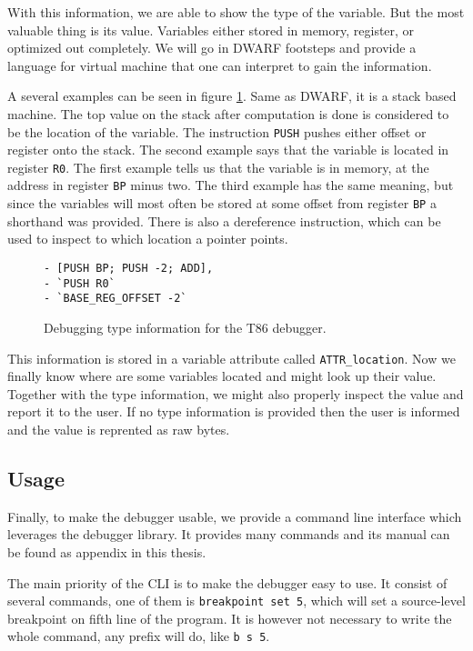 With this information, we are able to show the type of the variable.
But the most valuable thing is its value. Variables either stored
in memory, register, or optimized out completely. We will go in
DWARF footsteps and provide a language for virtual machine that one
can interpret to gain the information.

A several examples can be seen in figure \ref{fig:t86dbg-vm}. Same as DWARF, it
is a stack based machine. The top value on the stack after computation is done
is considered to be the location of the variable. The instruction \texttt{PUSH}
pushes either offset or register onto the stack. The second example says that
the variable is located in register \texttt{R0}. The first example tells us
that the variable is in memory, at the address in register \texttt{BP} minus
two. The third example has the same meaning, but since the variables will
most often be stored at some offset from register \texttt{BP} a shorthand
was provided. There is also a dereference instruction, which can be used
to inspect to which location a pointer points.

\begin{figure}
    \begin{lstlisting}
- [PUSH BP; PUSH -2; ADD],
- `PUSH R0`
- `BASE_REG_OFFSET -2`
    \end{lstlisting}
    \caption{Debugging type information for the T86 debugger.}
    \label{fig:t86dbg-vm}
\end{figure}

This information is stored in a variable attribute called
\texttt{ATTR\_location}. Now we finally know where are some variables located
and might look up their value. Together with the type information, we might
also properly inspect the value and report it to the user. If no type
information is provided then the user is informed and the value is reprented as
raw bytes.

\subsection{Usage}
Finally, to make the debugger usable, we provide a command line interface which
leverages the debugger library. It provides many commands and its manual can be
found as appendix in this thesis.

The main priority of the CLI is to make the debugger easy to use. It consist of
several commands, one of them is \texttt{breakpoint set 5}, which will set a
source-level breakpoint on fifth line of the program. It is however not
necessary to write the whole command, any prefix will do, like \texttt{b s 5}.

